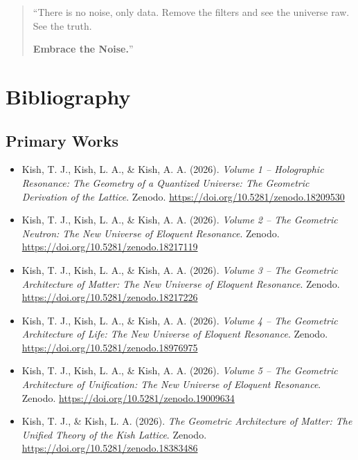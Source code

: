 \documentclass[11pt, letterpaper, openany]{book}
\begin{document}
\begin{quote}
“There is no noise, only data. Remove the filters and see the universe raw. See the truth.

\textbf{Embrace the Noise.}”
\end{quote}

\chapter*{Bibliography}
\section*{Primary Works}
\begin{itemize}
    \item Kish, T. J., Kish, L. A., \& Kish, A. A. (2026). \textit{Volume 1 -- Holographic Resonance: The Geometry of a Quantized Universe: The Geometric Derivation of the Lattice}. Zenodo. \url{https://doi.org/10.5281/zenodo.18209530}

    \item Kish, T. J., Kish, L. A., \& Kish, A. A. (2026). \textit{Volume 2 -- The Geometric Neutron: The New Universe of Eloquent Resonance}. Zenodo. \url{https://doi.org/10.5281/zenodo.18217119}

    \item Kish, T. J., Kish, L. A., \& Kish, A. A. (2026). \textit{Volume 3 -- The Geometric Architecture of Matter: The New Universe of Eloquent Resonance}. Zenodo. \url{https://doi.org/10.5281/zenodo.18217226}
	
	\item Kish, T. J., Kish, L. A., \& Kish, A. A. (2026). \textit{Volume 4 -- The Geometric Architecture of Life: The New Universe of Eloquent Resonance}. Zenodo. \url{https://doi.org/10.5281/zenodo.18976975}
	
	\item Kish, T. J., Kish, L. A., \& Kish, A. A. (2026). \textit{Volume 5 -- The Geometric Architecture of Unification: The New Universe of Eloquent Resonance}. Zenodo. \url{https://doi.org/10.5281/zenodo.19009634}

    \item Kish, T. J., \& Kish, L. A. (2026). \textit{The Geometric Architecture of Matter: The Unified Theory of the Kish Lattice}. Zenodo. \url{https://doi.org/10.5281/zenodo.18383486}
\end{itemize}
\end{document}
